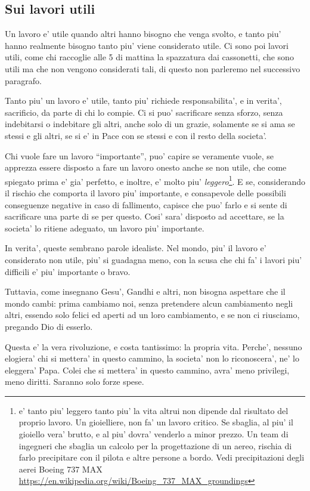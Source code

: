 \subsection{Sui lavori utili}
Un lavoro e' utile quando altri hanno bisogno che venga svolto, e tanto piu' hanno realmente bisogno tanto piu' viene considerato utile. Ci sono poi lavori utili, come chi raccoglie alle 5 di mattina la spazzatura dai cassonetti, che sono utili ma che non vengono considerati tali, di questo non parleremo nel successivo paragrafo.

Tanto piu' un lavoro e' utile, tanto piu' richiede responsabilita', e in verita', sacrificio, da parte di chi lo compie. Ci si puo' sacrificare senza sforzo, senza indebitarsi o indebitare gli altri, anche solo di un grazie, solamente se si ama se stessi e gli altri, se si e' in Pace con se stessi e con il resto della societa'.

Chi vuole fare un lavoro ``importante'', puo' capire se veramente vuole, se apprezza essere disposto a fare un lavoro onesto anche se non utile, che come spiegato prima e' gia' perfetto, e inoltre, e' molto piu' \emph{leggero}\footnote{e' tanto piu' leggero tanto piu' la vita altrui non dipende dal risultato del proprio lavoro. Un gioielliere, non fa' un lavoro critico. Se sbaglia, al piu' il gioiello vera' brutto, e al piu' dovra' venderlo a minor prezzo. Un team di ingegneri che sbaglia un calcolo per la progettazione di un aereo, rischia di farlo precipitare con il pilota e altre persone a bordo. Vedi precipitazioni degli aerei Boeing 737 MAX \url{https://en.wikipedia.org/wiki/Boeing\_737\_MAX\_groundings}}. 
E se, considerando il rischio che comporta il lavoro piu' importante, e consapevole delle possibili conseguenze negative in caso di fallimento, capisce che puo' farlo e si sente di sacrificare una parte di se per questo. Cosi' sara' disposto ad accettare, se la societa' lo ritiene adeguato, un lavoro piu' importante.

In verita', queste sembrano parole idealiste. Nel mondo, piu' il lavoro e' considerato non utile, piu' si guadagna meno, con la scusa che chi fa' i lavori piu' difficili e' piu' importante o bravo.

Tuttavia, come insegnano Gesu', Gandhi e altri, non bisogna aspettare che il mondo cambi: prima cambiamo noi, senza pretendere alcun cambiamento negli altri, essendo solo felici ed aperti ad un loro cambiamento, e se non ci riusciamo, pregando Dio di esserlo.

Questa e' la vera rivoluzione, e costa tantissimo: la propria vita. Perche', nessuno elogiera' chi si mettera' in questo cammino, la societa' non lo riconoscera', ne' lo eleggera' Papa. Colei che si mettera' in questo cammino, avra' meno privilegi, meno diritti. Saranno solo forze spese. 

